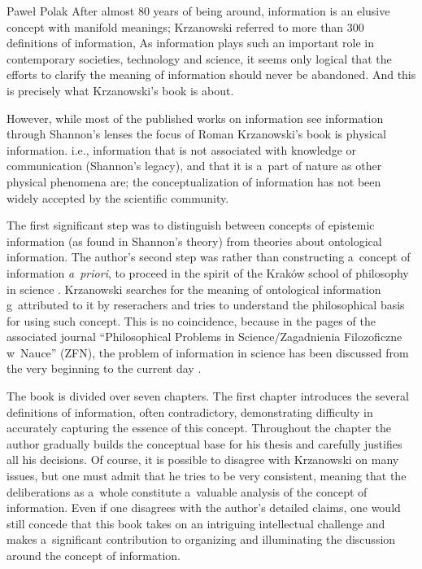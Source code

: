 \begin{newrevengenv}{Paweł Polak}
After almost 80 years of being around, information is an elusive concept with manifold meanings; Krzanowski
\parencite*[][]{krzanowski_ontological_2022} %
 referred to more than 300 definitions of information, As information plays such an important role in contemporary societies, technology and science, it seems only logical that the efforts to clarify the meaning of information should never be abandoned. And this is precisely what Krzanowski's book is about.

However, while most of the published works on information see information through Shannon's lenses the focus of Roman Krzanowski's book
\parencite[][]{krzanowski_ontological_2022} %
 is physical information. i.e., information that is not associated with knowledge or communication (Shannon's legacy), and that it is a~part of nature as other physical phenomena are; the conceptualization of information has not been widely accepted by the scientific community.

The first significant step was to distinguish between concepts of epistemic information (as found in Shannon's theory) from theories about ontological information. The author's second step was rather than constructing a~concept of information \textit{a~priori}, to proceed in the spirit of the Kraków school of philosophy in science
\parencites[][]{heller_how_2019}[][]{polak_philosophy_2019}[][]{polak_krakow_2022}. %
 Krzanowski searches for the meaning of ontological information g~attributed to it by reserachers and tries to understand the philosophical basis for using such concept. This is no coincidence, because in the pages of the associated journal ``Philosophical Problems in Science/Zagadnienia Filozoficzne w~Nauce'' (ZFN), the problem of information in science has been discussed from the very beginning to the current day 
\parencites*[][]{turek_filozoficzne_1978}[][]{turek_rozwazania_1981}[][]{krzanowski_minimal_2017}[][]{krzanowski_why_2020}.%


The book is divided over seven chapters. The first chapter introduces the several definitions of information, often contradictory, demonstrating difficulty in accurately capturing the essence of this concept. Throughout the chapter the author gradually builds the conceptual base for his thesis and carefully justifies all his decisions. Of course, it is possible to disagree with Krzanowski on many issues, but one must admit that he tries to be very consistent, meaning that the deliberations as a~whole constitute a~valuable analysis of the concept of information. Even if one disagrees with the author's detailed claims, one would still concede that this book takes on an intriguing intellectual challenge and makes a~significant contribution to organizing and illuminating the discussion around the concept of information.


\end{newrevengenv}
